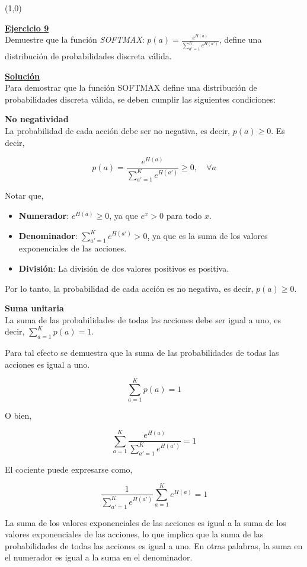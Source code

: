 \documentclass[12pt]{article}
\newlength\tindent
\renewcommand{\indent}{\hspace*{\tindent}}
\begin{document}
\begin{itemize}
    \line(1,0){\textwidth}

    \indent\underline{\textbf{Ejercicio 9}}\\
    Demuestre que la función \textit{SOFTMAX}: $p(a)=\frac{e^{H(a)}}{\sum_{a'=1}^{K} e^{H(a')}}$, define una distribución de probabilidades discreta válida.

    \indent\underline{\textbf{Solución}}\\
    Para demostrar que la función SOFTMAX define una distribución de probabilidades discreta válida, se deben cumplir las siguientes condiciones:

    \textbf{No negatividad}\\
    La probabilidad de cada acción debe ser no negativa, es decir, $p(a) \geq 0$.
    Es decir,

    \[
        p(a) = \frac{e^{H(a)}}{\sum_{a'=1}^{K} e^{H(a')}} \geq 0, \quad \forall a
    \]

    Notar que,

    \begin{itemize}
        \item \textbf{Numerador}: $e^{H(a)} \geq 0$, ya que $e^{x} > 0$ para todo $x$.
        \item \textbf{Denominador}: $\sum_{a'=1}^{K} e^{H(a')} > 0$, ya que es la suma de los valores exponenciales de las acciones.
        \item \textbf{División}: La división de dos valores positivos es positiva.
    \end{itemize}

    Por lo tanto, la probabilidad de cada acción es no negativa, es decir, $p(a) \geq 0$.

    \textbf{Suma unitaria}\\
    La suma de las probabilidades de todas las acciones debe ser igual a uno, es decir, $\sum_{a=1}^{K} p(a) = 1$.

    Para tal efecto se demuestra que la suma de las probabilidades de todas las acciones es igual a uno.

    \[
        \sum_{a=1}^{K} p(a) = 1
    \]

    O bien,

    \[
        \sum_{a=1}^{K} \frac{e^{H(a)}}{\sum_{a'=1}^{K} e^{H(a')}} = 1
    \]

    El cociente puede expresarse como,

    \[
        \frac{1}{\sum_{a'=1}^{K} e^{H(a')}} \sum_{a=1}^{K} e^{H(a)} = 1
    \]

    La suma de los valores exponenciales de las acciones es igual a la suma de los valores exponenciales de las acciones, lo que implica que la suma de las probabilidades de todas las acciones es igual a uno.
    En otras palabras, la suma en el numerador es igual a la suma en el denominador.


\end{itemize}
\end{document}

